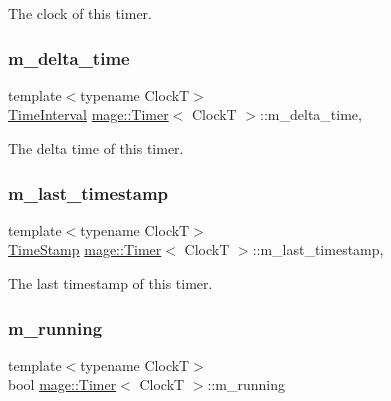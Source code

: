 The clock of this timer. \hypertarget{classmage_1_1_timer_a9cb9bf6cd0f567a8a1fad02a89d98aa2}{}\label{classmage_1_1_timer_a9cb9bf6cd0f567a8a1fad02a89d98aa2} 
\subsubsection{\texorpdfstring{m\+\_\+delta\+\_\+time}{m\_delta\_time}}
{\footnotesize\ttfamily template$<$typename ClockT$>$ \\
\hyperlink{classmage_1_1_timer_a5c0fd78ceab0110637622bd0e9b8424d}{Time\+Interval} \hyperlink{classmage_1_1_timer}{mage\+::\+Timer}$<$ ClockT $>$\+::m\+\_\+delta\+\_\+time\hspace{0.3cm}{\ttfamily [mutable]}, {\ttfamily [private]}}

The delta time of this timer. \hypertarget{classmage_1_1_timer_a01e35b71a5fe5eebe3b05c1b675cb5ce}{}\label{classmage_1_1_timer_a01e35b71a5fe5eebe3b05c1b675cb5ce} 
\subsubsection{\texorpdfstring{m\+\_\+last\+\_\+timestamp}{m\_last\_timestamp}}
{\footnotesize\ttfamily template$<$typename ClockT$>$ \\
\hyperlink{classmage_1_1_timer_abd11aea6107940b09ef3c48f62c81668}{Time\+Stamp} \hyperlink{classmage_1_1_timer}{mage\+::\+Timer}$<$ ClockT $>$\+::m\+\_\+last\+\_\+timestamp\hspace{0.3cm}{\ttfamily [mutable]}, {\ttfamily [private]}}

The last timestamp of this timer. \hypertarget{classmage_1_1_timer_a195789c583eb8bd3b9f0058214b74bc5}{}\label{classmage_1_1_timer_a195789c583eb8bd3b9f0058214b74bc5} 
\subsubsection{\texorpdfstring{m\+\_\+running}{m\_running}}
{\footnotesize\ttfamily template$<$typename ClockT$>$ \\
bool \hyperlink{classmage_1_1_timer}{mage\+::\+Timer}$<$ ClockT $>$\+::m\+\_\+running\hspace{0.3cm}{\ttfamily [private]}}

